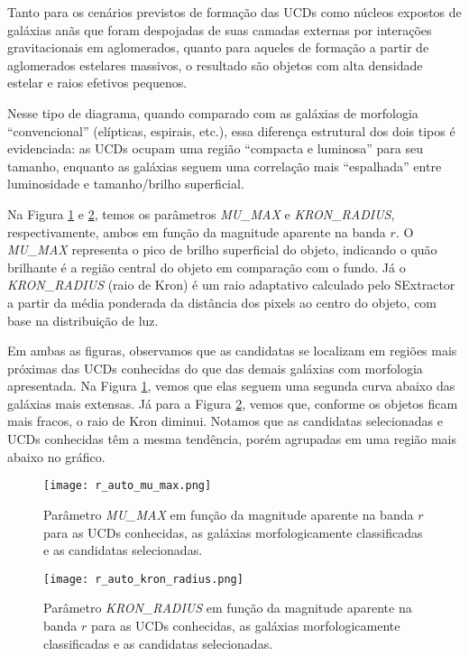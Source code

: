 Tanto para os cenários previstos de formação das UCDs como núcleos expostos de galáxias anãs que foram despojadas de suas camadas externas por interações gravitacionais em aglomerados, quanto para aqueles de formação a partir de aglomerados estelares massivos, o resultado são objetos com alta densidade estelar e raios efetivos pequenos.

Nesse tipo de diagrama, quando comparado com as galáxias de morfologia “convencional” (elípticas, espirais, etc.), essa diferença estrutural dos dois tipos é evidenciada: as UCDs ocupam uma região “compacta e luminosa” para seu tamanho, enquanto as galáxias seguem uma correlação mais “espalhada” entre luminosidade e tamanho/brilho superficial.

Na Figura \ref{r_auto_mu_max} e \ref{r_auto_kron_radius}, temos os parâmetros \textit{MU\_MAX} e \textit{KRON\_RADIUS}, respectivamente, ambos em função da magnitude aparente na banda $r$. O \textit{MU\_MAX} representa o pico de brilho superficial do objeto, indicando o quão brilhante é a região central do objeto em comparação com o fundo. Já o \textit{KRON\_RADIUS} (raio de Kron) é um raio adaptativo calculado pelo SExtractor a partir da média ponderada da distância dos pixels ao centro do objeto, com base na distribuição de luz.

Em ambas as figuras, observamos que as candidatas se localizam em regiões mais próximas das UCDs conhecidas do que das demais galáxias com morfologia apresentada. Na Figura \ref{r_auto_mu_max}, vemos que elas seguem uma segunda curva abaixo das galáxias mais extensas. Já para a Figura \ref{r_auto_kron_radius}, vemos que, conforme os objetos ficam mais fracos, o raio de Kron diminui. Notamos que as candidatas selecionadas e UCDs conhecidas têm a mesma tendência, porém agrupadas em uma região mais abaixo no gráfico.

\begin{figure}[!ht]
    \begin{center}
    \texttt{[image: r\_auto\_mu\_max.png]}
    \caption[]{Parâmetro \textit{MU\_MAX} em função da magnitude aparente na banda $r$ para as UCDs conhecidas, as galáxias morfologicamente classificadas e as candidatas selecionadas.}
    \label{r_auto_mu_max}
    \end{center}
\end{figure}


\begin{figure}[!ht]
    \begin{center}
    \texttt{[image: r\_auto\_kron\_radius.png]}
    \caption[]{Parâmetro \textit{KRON\_RADIUS} em função da magnitude aparente na banda $r$ para as UCDs conhecidas, as galáxias morfologicamente classificadas e as candidatas selecionadas.}
    \label{r_auto_kron_radius}
    \end{center}
\end{figure}


